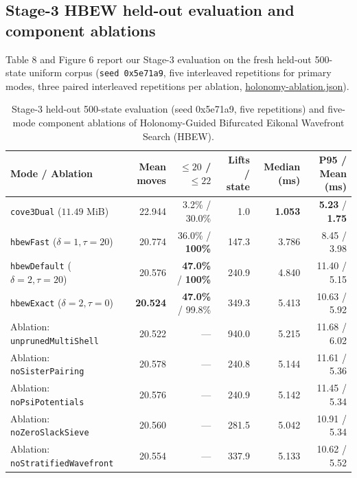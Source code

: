 \documentclass[10pt,twocolumn,letterpaper]{article}
\begin{document}
\hypertarget{stage-3-hbew-held-out-evaluation-and-component-ablations}{%
\subsection{Stage-3 HBEW held-out evaluation and component ablations}\label{stage-3-hbew-held-out-evaluation-and-component-ablations}}

Table 8 and Figure 6 report our Stage-3 evaluation on the fresh held-out
500-state uniform corpus (\texttt{seed\ 0x5e71a9}, five interleaved
repetitions for primary modes, three paired interleaved repetitions per
ablation,
\href{https://github.com/nahin333/rubikscube/blob/main/research/results/holonomy-ablation.json}{holonomy-ablation.json}).

\begin{table}[t]
\caption{Stage-3 held-out 500-state evaluation (seed 0x5e71a9, five repetitions) and five-mode component ablations of Holonomy-Guided Bifurcated Eikonal Wavefront Search (HBEW).}
\centering\small
\begin{tabularx}{\textwidth}{@{}Lrrrrr@{}}
\toprule
Mode / Ablation & Mean moves & \(\le 20\) / \(\le 22\) & Lifts / state & Median (ms) & P95 / Mean (ms) \\
\midrule
\texttt{cove3Dual} (\(11.49\) MiB) & 22.944 & 3.2\% / 30.0\% & 1.0 & \textbf{1.053} & \textbf{5.23} / \textbf{1.75} \\
\texttt{hbewFast} (\(\delta=1, \tau=20\)) & 20.774 & 36.0\% / \textbf{100\%} & 147.3 & 3.786 & 8.45 / 3.98 \\
\texttt{hbewDefault} (\(\delta=2, \tau=20\)) & 20.576 & \textbf{47.0\%} / \textbf{100\%} & 240.9 & 4.840 & 11.40 / 5.15 \\
\texttt{hbewExact} (\(\delta=2, \tau=0\)) & \textbf{20.524} & \textbf{47.0\%} / 99.8\% & 349.3 & 5.413 & 10.63 / 5.92 \\
Ablation: \texttt{unprunedMultiShell} & 20.522 & --- & 940.0 & 5.215 & 11.68 / 6.02 \\
Ablation: \texttt{noSisterPairing} & 20.578 & --- & 240.8 & 5.144 & 11.61 / 5.36 \\
Ablation: \texttt{noPsiPotentials} & 20.576 & --- & 240.9 & 5.142 & 11.45 / 5.34 \\
Ablation: \texttt{noZeroSlackSieve} & 20.560 & --- & 281.5 & 5.042 & 10.91 / 5.34 \\
Ablation: \texttt{noStratifiedWavefront} & 20.554 & --- & 337.9 & 5.133 & 10.62 / 5.52 \\
\bottomrule
\end{tabularx}
\end{table}
\end{document}
